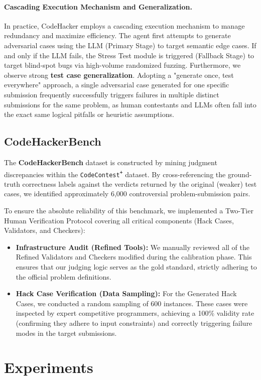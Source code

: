 \documentclass[11pt]{article}
\newcommand{\pl}{\textsuperscript{+}}
\begin{document}
{\paragraph{Cascading Execution Mechanism and Generalization.} In practice, CodeHacker employs a cascading execution mechanism to manage redundancy and maximize efficiency. The agent first attempts to generate adversarial cases using the LLM (Primary Stage) to target semantic edge cases. If and only if the LLM fails, the Stress Test module is triggered (Fallback Stage) to target blind-spot bugs via high-volume randomized fuzzing. Furthermore, we observe strong \textbf{test case generalization}. Adopting a "generate once, test everywhere" approach, a single adversarial case generated for one specific submission frequently successfully triggers failures in multiple distinct submissions for the same problem, as human contestants and LLMs often fall into the exact same logical pitfalls or heuristic assumptions.}


\subsection{CodeHackerBench}
The \textbf{CodeHackerBench} dataset is constructed by mining judgment discrepancies within the \texttt{CodeContest\pl} dataset. By cross-referencing the ground-truth correctness labels against the verdicts returned by the original (weaker) test cases, we identified approximately 6,000 controversial problem-submission pairs. 

To ensure the absolute reliability of this benchmark, we implemented a Two-Tier Human Verification Protocol covering all critical components (Hack Cases, Validators, and Checkers):
\begin{itemize}
    \item \textbf{Infrastructure Audit (Refined Tools):} We manually reviewed all of the Refined Validators and Checkers modified during the calibration phase. This ensures that our judging logic serves as the gold standard, strictly adhering to the official problem definitions.
    \item \textbf{Hack Case Verification (Data Sampling):} For the Generated Hack Cases, we conducted a random sampling of 600 instances. These cases were inspected by expert competitive programmers, achieving a 100\% validity rate (confirming they adhere to input constraints) and correctly triggering failure modes in the target submissions.
\end{itemize}
\section{Experiments}
\end{document}

